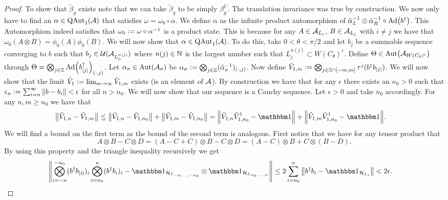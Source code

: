 \documentclass[11pt,a4paper,twoside]{article}
\numberwithin{equation}{section}
\begin{document}
	\begin{proof}
		To show that $\tilde{\beta}_g$ exists note that we can take $\tilde{\beta}_g$ to be simply $\beta_g^{U}$. The translation invariance was true by construction. We now only have to find an $\alpha\in\QAut{\AA}$ that satisfies $\omega=\omega_0\circ\alpha$. We define $\alpha$ as the infinite product automorphism of $\tilde{\alpha}_L^{-1}\otimes\tilde{\alpha}_R^{-1}\circ\Ad{b^\dagger}$. This Automorphism indeed satisfies that $\omega_0\defeq \omega\circ\alpha^{-1}$ is a product state. This is because for any $A\in\AA_{L_{i}}$, $B\in\AA_{L_{j}}$ with $i\neq j$ we have that $\omega_0(A\otimes B)=\phi_0(A)\phi_0(B)$. We will now show that $\alpha\in\QAut{\AA}$. To do this, take $0<\theta<\pi/2$ and let $b_j$ be a summable sequence converging to $b$ such that $b_j\in\UU(\AA_{L_0^{n(j)}})$ where $n(j)\in\NN$ is the largest number such that $L_{j}^{n(j)}\subset W(C_\theta)^c$. Define $\Theta\in\Aut{\AA_{W(C_\theta)^c}}$ through $\Theta=\bigotimes_{j\in\ZZ}\Ad{b_\abs{j}^\dagger}_{(\cdot,j)}$. Let $\alpha_\sigma\in\Aut{\AA_\sigma}$ be $\alpha_\sigma\defeq \bigotimes_{j\in\ZZ}(\tilde\alpha_\sigma^{-1})_{(\cdot,j)}$. Now define $\tilde V_{1,m}\defeq\bigotimes_{j\in\ZZ\cap[-m,m]}\tau^j (b^\dagger b_\abs{j})$. We will now show that the limit $\tilde V_1\defeq\lim_{m\rightarrow\infty}\tilde V_{1,m}$ exists (is an element of $\AA$). By construction we have that for any $\epsilon$ there exists an $n_0>0$ such that $\epsilon_n\defeq\sum_{i=n}^\infty\norm{b-b_i}<\epsilon$ for all $n>n_0$. We will now show that our sequence is a Cauchy sequence. Let $\epsilon>0$ and take $n_0$ accordingly. For any $n,m\geq n_0$ we have that
		\begin{align}
			\norm{\tilde{V}_{1,n}-\tilde{V}_{1,m}}&\leq \norm{\tilde{V}_{1,n}-\tilde{V}_{1,n_0}}+\norm{\tilde{V}_{1,m}-\tilde{V}_{1,n_0}}=\norm{\tilde{V}_{1,n}\tilde{V}_{1,n_0}^\dagger-\id}+\norm{\tilde{V}_{1,m}\tilde{V}_{1,n_0}^\dagger-\id}.
		\end{align}
		We will find a bound on the first term as the bound of the second term is analogous. First notice that we have for any tensor product that
		\begin{equation}
			A\otimes B-C\otimes D=(A-C+C)\otimes B-C\otimes D=(A-C)\otimes B+C\otimes (B-D).
		\end{equation}
		By using this property and the triangle inequality recursively we get
		\begin{align}
			&\norm{\bigotimes_{i=-n}^{-n_0}(b^\dagger b_\abs{i})_i\bigotimes_{i=n_0}^{n}(b^\dagger b_i)_i-\id_{\HH_{L_{-n,\ldots,-n_0}}}\otimes\id_{\HH_{L_{n_0,\ldots,n}}}}\leq 2\sum_{i=n_0}^{n}\norm{b^\dagger b_i-\id_{\HH_{L_i}}}<2\epsilon.

\end{align}
\end{proof}
\end{document}
